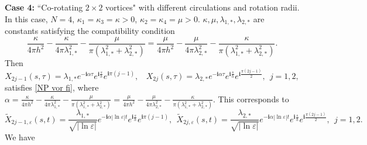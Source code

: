 \documentclass[12pt,reqno]{amsart}
\numberwithin{equation}{section}
\theoremstyle{definition}
\theoremstyle{remark}
\begin{document}
\textbf{Case 4:} ``Co-rotating  $ 2\times2 $ vortices" with different circulations and rotation radii. In this case, $ N= 4 $, $ \kappa_1=\kappa_3=\kappa>0 $, $ \kappa_2=\kappa_4=\mu>0$. $ \kappa,\mu, \lambda_{1,*},\lambda_{2,*}  $ are constants satisfying the compatibility condition
\begin{equation}\label{compa cond2}
\frac{\kappa}{4\pi h^2} -\frac{\kappa}{4\pi \lambda_{1,*}^2} -\frac{\mu}{\pi \left (\lambda_{1,*}^2+\lambda_{2,*}^2\right )}=\frac{\mu}{4\pi h^2} -\frac{\mu}{4\pi \lambda_{2,*}^2} -\frac{\kappa}{\pi \left (\lambda_{1,*}^2+\lambda_{2,*}^2\right )}.
\end{equation}
Then 
\begin{equation*} 
X_{2j-1}(s,\tau)=\lambda_{1,*}e^{-\mathbf{i}\alpha\tau}e^{\mathbf{i}\frac{s}{h}}e^{\mathbf{i}\pi(j-1)},\ \ \ \ 	X_{2j}(s,\tau)=\lambda_{2,*}e^{-\mathbf{i}\alpha\tau}e^{\mathbf{i}\frac{s}{h}}e^{\mathbf{i}\frac{\pi(2j-1)}{2}},\ \ j=1,2,
\end{equation*}
satisfies \eqref{NP vor fi}, where $ \alpha=\frac{\kappa}{4\pi h^2} -\frac{\kappa}{4\pi \lambda_{1,*}^2} -\frac{\mu}{\pi \left (\lambda_{1,*}^2+\lambda_{2,*}^2\right )}=\frac{\mu}{4\pi h^2} -\frac{\mu}{4\pi \lambda_{2,*}^2} -\frac{\kappa}{\pi \left (\lambda_{1,*}^2+\lambda_{2,*}^2\right )}  $. This corresponds to  
\begin{equation}\label{fila 4}
\tilde{X}_{2j-1,\varepsilon}(s,t)=\frac{\lambda_{1,*}}{\sqrt{|\ln\varepsilon|}}e^{-\mathbf{i}\alpha|\ln\varepsilon| t}e^{\mathbf{i}\frac{s}{h}}e^{\mathbf{i}\pi(j-1)},\ \  	\tilde{X}_{2j,\varepsilon}(s,t)=\frac{\lambda_{2,*}}{\sqrt{|\ln\varepsilon|}}e^{-\mathbf{i}\alpha|\ln\varepsilon| t}e^{\mathbf{i}\frac{s}{h}}e^{\mathbf{i}\frac{\pi(2j-1)}{2}},\ \ j=1,2.
\end{equation}
We have
\end{document}
